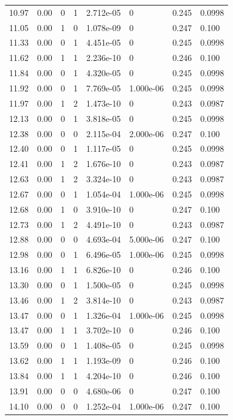 \documentclass[preview]{standalone}
\begin{document}
{{{\begin{tabular}{L{1.2cm}C{1.2cm} C{0.3cm}C{0.5cm} C{1.4cm}C{1.4cm} C{1.4cm}C{1.4cm}}
  10.97  &  0.00  & 0     &  1 &  2.712e-05  & 0  & 0.245 &  0.0998   \\ 
  11.05  &  0.00  & 1     &  0 &  1.078e-09  & 0  & 0.247 &  0.100   \\ 
  11.33  &  0.00  & 0     &  1 &  4.451e-05  & 0  & 0.245 &  0.0998   \\ 
  11.62  &  0.00  & 1     &  1 &  2.236e-10  & 0  & 0.246 &  0.100   \\ 
  11.84  &  0.00  & 0     &  1 &  4.320e-05  & 0  & 0.245 &  0.0998   \\ 
  11.92  &  0.00  & 0     &  1 &  7.769e-05  & 1.000e-06  & 0.245 &  0.0998   \\ 
  11.97  &  0.00  & 1     &  2 &  1.473e-10  & 0  & 0.243 &  0.0987   \\ 
  12.13  &  0.00  & 0     &  1 &  3.818e-05  & 0  & 0.245 &  0.0998   \\ 
  12.38  &  0.00  & 0     &  0 &  2.115e-04  & 2.000e-06  & 0.247 &  0.100   \\ 
  12.40  &  0.00  & 0     &  1 &  1.117e-05  & 0  & 0.245 &  0.0998   \\ 
  12.41  &  0.00  & 1     &  2 &  1.676e-10  & 0  & 0.243 &  0.0987   \\ 
  12.63  &  0.00  & 1     &  2 &  3.324e-10  & 0  & 0.243 &  0.0987   \\ 
  12.67  &  0.00  & 0     &  1 &  1.054e-04  & 1.000e-06  & 0.245 &  0.0998   \\ 
  12.68  &  0.00  & 1     &  0 &  3.910e-10  & 0  & 0.247 &  0.100   \\ 
  12.73  &  0.00  & 1     &  2 &  4.491e-10  & 0  & 0.243 &  0.0987   \\ 
  12.88  &  0.00  & 0     &  0 &  4.693e-04  & 5.000e-06  & 0.247 &  0.100   \\ 
  12.98  &  0.00  & 0     &  1 &  6.496e-05  & 1.000e-06  & 0.245 &  0.0998   \\ 
  13.16  &  0.00  & 1     &  1 &  6.826e-10  & 0  & 0.246 &  0.100   \\ 
  13.30  &  0.00  & 0     &  1 &  1.500e-05  & 0  & 0.245 &  0.0998   \\ 
  13.46  &  0.00  & 1     &  2 &  3.814e-10  & 0  & 0.243 &  0.0987   \\ 
  13.47  &  0.00  & 0     &  1 &  1.326e-04  & 1.000e-06  & 0.245 &  0.0998   \\ 
  13.47  &  0.00  & 1     &  1 &  3.702e-10  & 0  & 0.246 &  0.100   \\ 
  13.59  &  0.00  & 0     &  1 &  1.408e-05  & 0  & 0.245 &  0.0998   \\ 
  13.62  &  0.00  & 1     &  1 &  1.193e-09  & 0  & 0.246 &  0.100   \\ 
  13.84  &  0.00  & 1     &  1 &  4.204e-10  & 0  & 0.246 &  0.100   \\ 
  13.91  &  0.00  & 0     &  0 &  4.680e-06  & 0  & 0.247 &  0.100   \\ 
  14.10  &  0.00  & 0     &  0 &  1.252e-04  & 1.000e-06  & 0.247 &  0.100   \\ 
\hline 
\end{tabular} 

}}}
\end{document}
